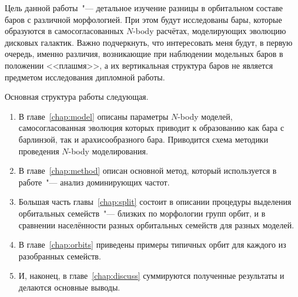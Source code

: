 \documentclass{trlnotes}
\begin{document}
Цель данной работы~"--- детальное изучение разницы в орбитальном составе баров с  различной морфологией. При этом будут исследованы бары, которые образуются в самосогласованных $N$-body расчётах, моделирующих эволюцию дисковых галактик. Важно подчеркнуть, что интересовать меня будут, в первую очередь, именно различия, возникающие при наблюдении модельных баров в положении <<плашмя>>, а их вертикальная структура баров не является предметом исследования дипломной работы. 

Основная структура работы следующая.
\begin{enumerate}
\item В главе~\ref{chap:model} описаны параметры $N$-body моделей, самосогласованная эволюция которых приводит к образованию как бара с
  барлинзой, так и арахисообразного бара. Приводится схема методики проведения $N$-body моделирования.
\item В главе~\ref{chap:method} описан основной метод, который используется в работе~"--- анализ 
доминирующих частот.
\item Большая часть главы~\ref{chap:split} состоит в описании процедуры выделения орбитальных семейств~"---
близких по морфологии групп орбит, и в сравнении населённости разных орбитальных семейств для разных моделей. 
\item В главе~\ref{chap:orbits} приведены примеры типичных орбит для каждого из разобранных семейств.
\item И, наконец, в главе~\ref{chap:discuss} суммируются полученные результаты и делаются основные выводы.
\end{enumerate}
\end{document}
